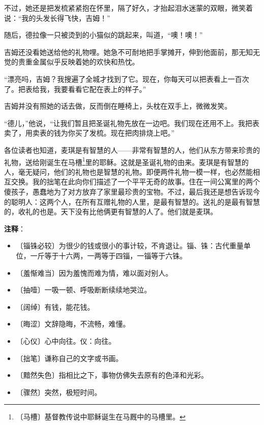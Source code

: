 \documentclass[12pt,UTF-8,openany]{ctexbook}
\begin{document}
\begin{normalsize}
    不过，她还是把发梳紧紧抱在怀里，隔了好久，才抬起泪水迷蒙的双眼，微笑着说：“我的头发长得飞快，吉姆！”
    
    随后，德拉像一只被烫到的小猫似的跳起来，叫道，“噢！噢！”
    
    吉姆还没看她送给他的礼物哩。她急不可耐地把手掌摊开，伸到他面前，那无知无觉的贵重金属似乎反映着她的欢快和热忱。
    
    “漂亮吗，吉姆？我搜遍了全城才找到了它。现在，你每天可以把表看上一百次了。把表给我，我要看看它配在表上的样子。”
    
    吉姆并没有照她的话去做，反而倒在睡椅上，头枕在双手上，微微发笑。
    
    “德儿，”他说，“让我们暂且把圣诞礼物先放在一边吧。我们现在还用不上。我把表卖了，用卖表的钱为你买了发梳。现在把肉排烧上吧。”
    
    各位读者也知道，麦琪是有智慧的人——非常有智慧的人，他们从东方带来珍贵的礼物，送给刚诞生在马槽\footnote{〔马槽〕基督教传说中耶稣诞生在马厩中的马槽里。}里的耶稣。这就是圣诞礼物的由来。麦琪是有智慧的人，毫无疑问，他们的礼物也是智慧的礼物。即便两件礼物一模一样，也必然能相互交换。我的拙笔在此向你们描述了一个平平无奇的故事。住在一间公寓里的两个傻孩子，愚蠢地为了对方放弃了家里最珍贵的宝物。不过，最后我还是想告诉现今的聪明人：这两个人，在所有互赠礼物的人里，是最有智慧的。送礼的是最有智慧的，收礼的也是。天下没有比他俩更有智慧的人了。他们就是麦琪。
    
\end{normalsize}


\newpage

\textbf{注释}：

\vspace{-1em}

\begin{itemize}
    \setlength\itemsep{-0.2em}
    \item 〔锱铢必较〕为很少的钱或很小的事计较，不肯退让。锱、铢：古代重量单位，一斤等于十六两，一两等于四锱，一锱等于六铢。
    \item 〔羞惭难当〕因为羞愧而难为情，难以面对别人。
    \item 〔抽噎〕一吸一顿、呼吸断断续续地哭泣。
    \item 〔阔绰〕有钱，能花钱。
    \item 〔晦涩〕文辞隐晦，不流畅，难懂。
    \item 〔心仪〕心中向往。仪：向往。
    \item 〔拙笔〕谦称自己的文字或书画。
    \item 〔黯然失色〕指相比之下，事物仿佛失去原有的色泽和光彩。
    \item 〔骤然〕突然，极短时间。
\end{itemize}
\end{document}
